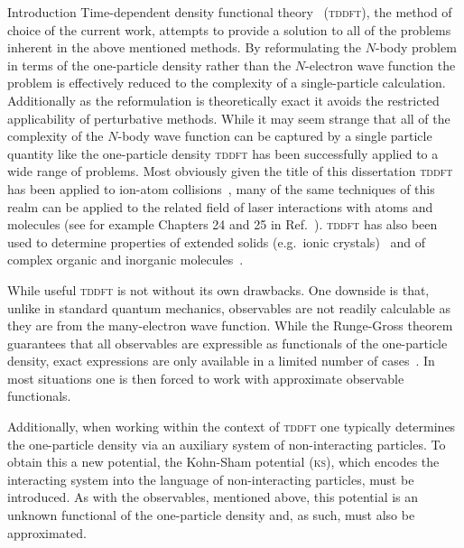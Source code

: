 \documentclass[letterpaper, 11 pt]{report}
\begin{document}
\begin{chapter}{Introduction \label{chap:intro}}
   Time-dependent density functional theory~\cite{tddft, ullrich} (\textsc{tddft}), the method of choice
   of the current work, attempts to provide a solution to all  of the problems inherent in the above
   mentioned methods. By reformulating the $N$-body problem in terms of the one-particle density rather
   than the $N$-electron wave function the problem is effectively reduced to the complexity of a
   single-particle calculation. Additionally as the reformulation is theoretically exact it avoids the
   restricted applicability of perturbative methods. While it may seem strange that all of the
   complexity of the $N$-body wave function can be captured by a single particle quantity like the
   one-particle density \textsc{tddft} has been successfully applied to a wide range of problems. Most
   obviously given the title of this dissertation \textsc{tddft} has been applied to ion-atom
   collisions~\cite{bgm-rev}, many of the same techniques of this realm can be applied to the related
   field of laser interactions with atoms and molecules (see for example Chapters 24 and 25 in
   Ref.~\cite{tddft}). \textsc{tddft} has also been used to determine properties of extended solids
   (e.g.\ ionic crystals)~\cite{extRev} and of complex organic and inorganic molecules~\cite{qcRev}.

   While useful \textsc{tddft} is not without its own drawbacks. One downside is that, unlike in
   standard quantum mechanics, observables are not readily calculable as they are from the many-electron
   wave function. While the Runge-Gross theorem~\cite{rgt} guarantees that all observables are
   expressible as functionals of the one-particle density, exact expressions are only available in a
   limited number of cases~\cite{obs_exac}. In most situations one is then forced to work with
   approximate observable functionals.

   Additionally, when working within the context of \textsc{tddft} one typically determines the
   one-particle density via an auxiliary system of non-interacting particles. To obtain this a new
   potential, the Kohn-Sham potential (\textsc{ks}), which encodes the interacting system into the
   language of non-interacting particles, must be introduced. As with the observables, mentioned above,
   this potential is an unknown functional of the one-particle density and, as such, must also be
   approximated.


\end{chapter}
\end{document}
